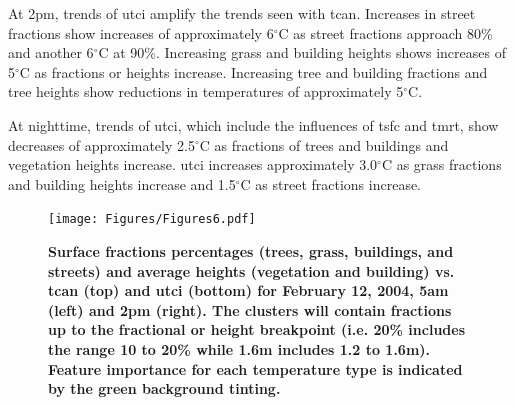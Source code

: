 \documentclass[final,3p,times,authoryear]{elsarticle}
\begin{document}
At 2pm, trends of \gls{utci} amplify the trends seen with \gls{tcan}. Increases in street fractions show increases of approximately 6$^{\circ}$C as street fractions approach 80\% and another 6$^{\circ}$C at 90\%. Increasing grass and building heights shows increases of 5$^{\circ}$C as fractions or heights increase. Increasing tree and building fractions and tree heights show reductions in temperatures of approximately 5$^{\circ}$C.

At nighttime, trends of \gls{utci}, which include the influences of \gls{tsfc} and \gls{tmrt}, show decreases of approximately 2.5$^{\circ}$C as fractions of trees and buildings and vegetation heights increase. \gls{utci} increases approximately 3.0$^{\circ}$C as grass fractions and building heights increase and 1.5$^{\circ}$C as street fractions increase.



\begin{figure}
\centering
\texttt{[image: Figures/Figures6.pdf]}
\caption{\bf Surface fractions percentages (trees, grass, buildings, and streets) and average heights (vegetation and building) vs. \gls{tcan} (top) and \gls{utci} (bottom) for February 12, 2004, 5am (left) and 2pm (right). The clusters will contain fractions up to the fractional or height breakpoint (i.e. 20\% includes the range 10 to 20\%  while 1.6m includes 1.2 to 1.6m). Feature importance for each temperature type is indicated by the green background tinting.}
 \label{fig:box5a} \label{fig:box14a}
\end{figure} 
\end{document}
